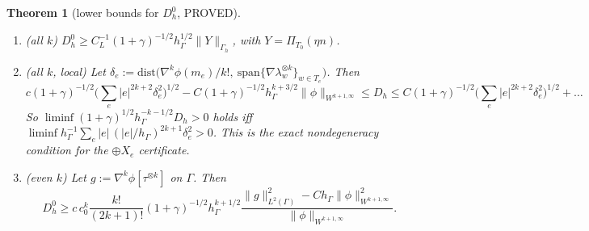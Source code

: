 \documentclass[11pt]{article}
\newtheorem{theorem}{Theorem}[section]
\theoremstyle{remark}
\newcommand{\hG}{h_\Gamma}
\newcommand{\Gh}{\Gamma_h}
\begin{document}
\begin{theorem}[lower bounds for $D^0_h$, PROVED]\label{thm:Dlower}
\begin{enumerate}
\item[(i)] (all $k$) $D^0_h\ge C_L^{-1}(1+\gamma)^{-1/2}\hG^{1/2}\|Y\|_{\Gh}$, with $Y=\Pi_{T_0}(\eta n)$.
\item[(ii)] (all $k$, local) Let $\delta_e:=\mathrm{dist}\big(\nabla^k\phi(m_e)/k!,\ \mathrm{span}\{\nabla\lambda_{w}^{\otimes k}\}_{w\in T_e}\big)$. Then
\[
c(1+\gamma)^{-1/2}\Big(\sum_e|e|^{2k+2}\delta_e^2\Big)^{1/2}-C(1+\gamma)^{-1/2}\hG^{k+3/2}\|\phi\|_{W^{k+1,\infty}}
\le D_h\le C(1+\gamma)^{-1/2}\Big(\sum_e|e|^{2k+2}\delta_e^2\Big)^{1/2}+\dots
\]
So $\liminf(1+\gamma)^{1/2}\hG^{-k-1/2}D_h>0$ holds iff $\liminf\hG^{-1}\sum_e|e|\,(|e|/\hG)^{2k+1}\delta_e^2>0$. This is the
exact nondegeneracy condition for the $\oplus X_e$ certificate.
\item[(iii)] (even $k$) Let $g:=\nabla^k\phi[\tau^{\otimes k}]$ on $\Gamma$. Then
\[
D^0_h\ge c\,c_0^k\frac{k!}{(2k+1)!}(1+\gamma)^{-1/2}\hG^{k+1/2}\frac{\|g\|_{L^2(\Gamma)}^2-C\hG\|\phi\|^2_{W^{k+1,\infty}}}{\|\phi\|_{W^{k+1,\infty}}}.
\]
\end{enumerate}
\end{theorem}
\end{document}
